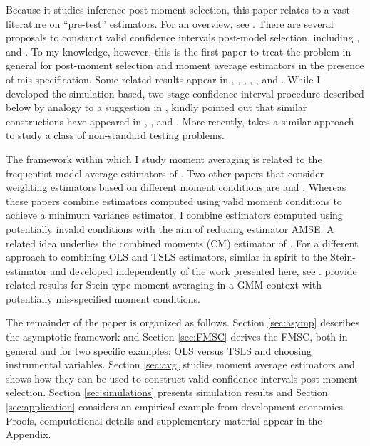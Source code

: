 Because it studies inference post-moment selection, this paper relates to a vast literature on ``pre-test'' estimators.
For an overview, see \citet{LeebPoetscher2005, LeebPoetscher2009}.
There are several proposals to construct valid confidence intervals post-model selection, including \cite{Kabaila1998}, \cite{HjortClaeskens} and \cite{KabailaLeeb2006}. 
To my knowledge, however, this is the first paper to treat the problem in general for post-moment selection and moment average estimators in the presence of mis-specification.
Some related results appear in \cite{Berkowitz2008}, \cite{Berkowitz2012}, \cite{Guggenberger2010}, \cite{Guggenberger2012}, \cite{GuggenbergerKumar}, and \cite{Caner2014}.
While I developed the simulation-based, two-stage confidence interval procedure described below by analogy to a suggestion in \cite{ClaeskensHjortbook}, \cite{Leeb} kindly pointed out that similar constructions have appeared in \cite{Loh1985}, \cite{Berger1994}, and \cite{Silvapulle1996}. More recently, \cite{McCloskey} takes a similar approach to study a class of non-standard testing problems.

The framework within which I study moment averaging is related to the frequentist model average estimators of \cite{HjortClaeskens}.
Two other papers that consider weighting estimators based on different moment conditions are \cite{Xiao} and \cite{ChenChavezLinton}.
Whereas these papers combine estimators computed using valid moment conditions to achieve a minimum variance estimator, I combine estimators computed using potentially invalid conditions with the aim of reducing estimator AMSE.
A related idea underlies the combined moments (CM) estimator of \cite{Judge2007}.
For a different approach to combining OLS and TSLS estimators, similar in spirit to the Stein-estimator and developed independently of the work presented here, see \cite{HansenStein}. 
\cite{ChengLiaoShi} provide related results for Stein-type moment averaging in a GMM context with potentially mis-specified moment conditions.


The remainder of the paper is organized as follows.
Section \ref{sec:asymp} describes the asymptotic framework and Section \ref{sec:FMSC} derives the FMSC, both in general and for two specific examples: OLS versus TSLS and choosing instrumental variables.
Section \ref{sec:avg} studies moment average estimators and shows how they can be used to construct valid confidence intervals post-moment selection.
Section \ref{sec:simulations} presents simulation results and Section \ref{sec:application} considers an empirical example from development economics.
Proofs, computational details and supplementary material appear in the Appendix. 
